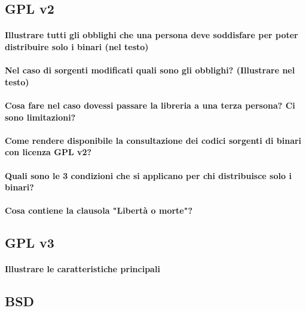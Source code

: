 \documentclass[a4paper]{article}
\begin{document}
		\subsection{GPL v2}
		
			\paragraph{Illustrare tutti gli obblighi che una persona deve soddisfare per poter distribuire solo i binari 	(nel testo)}
		
			\paragraph{Nel caso di sorgenti modificati quali sono gli obblighi? (Illustrare nel testo)}
		
			\paragraph{Cosa fare nel caso dovessi passare la libreria a una terza persona? Ci sono limitazioni?}
			
			\paragraph{Come rendere disponibile la consultazione dei codici sorgenti di binari con licenza GPL v2?} %
			
			\paragraph{Quali sono le 3 condizioni che si applicano per chi distribuisce solo i binari?}
			
			\paragraph{Cosa contiene la clausola "Libertà o morte"?}
		
		\subsection{GPL v3}
			
			\paragraph{Illustrare le caratteristiche principali}
		
		\subsection{BSD}
		
\end{document}
